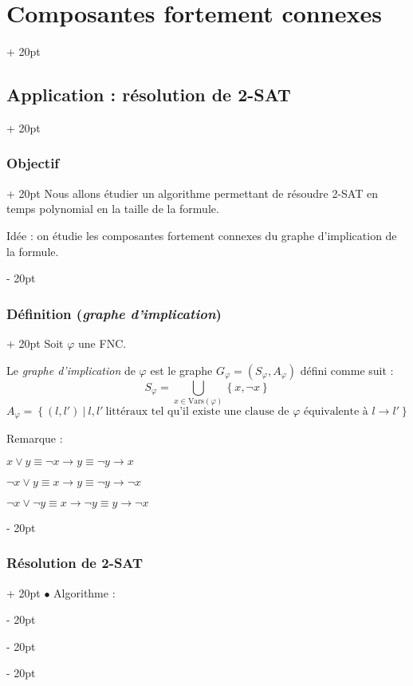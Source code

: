 \documentclass[a4paper, 12pt, twoside]{article}
\newcommand{\set}[1]{\left\{ #1 \right\}}
\newcommand{\ind}[1][20pt]{\advance\leftskip + #1}
\newcommand{\deind}[1][20pt]{\advance\leftskip - #1}
\newenvironment{indt}[2][20pt]{#2 \par \ind[#1]}{\par \deind} %
\begin{document}
\begin{indt}{\section{Composantes fortement connexes}}
\begin{indt}{\subsection{Application : résolution de 2-SAT}}
            \vspace{12pt}
            
            \begin{indt}{\subsubsection{Objectif}}
                Nous allons étudier un algorithme permettant de résoudre 2-SAT en temps polynomial en la taille de la formule.

                Idée : on étudie les composantes fortement connexes du graphe d'implication de la formule.
            \end{indt}

            \vspace{12pt}
            
            \begin{indt}{\subsubsection{Définition (\textit{graphe d'implication})}}
                Soit $\varphi$ une FNC.

                Le \textit{graphe d'implication} de $\varphi$ est le graphe $G_\varphi = (S_\varphi, A_\varphi)$ défini comme suit :
                \[
                    S_\varphi = \bigcup_{x \in \mathrm{Vars}(\varphi)} \set{x, \neg x}
                \]
                \[
                    A_\varphi = \set{(l, l')\ |\ l, l'\ \text{littéraux tel qu'il existe une clause de $\varphi$ équivalente à $l \rightarrow l'$}}
                \]

                \vspace{6pt}
                
                Remarque :
                
                $x \vee y \equiv \neg x \rightarrow y \equiv \neg y \rightarrow x$

                $\neg x \vee y \equiv x \rightarrow y \equiv \neg y \rightarrow \neg x$

                $\neg x \vee \neg y \equiv x \rightarrow \neg y \equiv y \rightarrow \neg x$
            \end{indt}

            \vspace{12pt}
            
            \begin{indt}{\subsubsection{Résolution de 2-SAT}}
                $\bullet$ Algorithme :


\end{indt}
\end{indt}
\end{indt}
\end{document}
